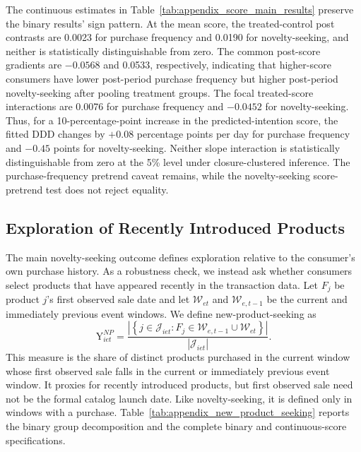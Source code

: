 \documentclass[11 pt]{article}
\begin{document}
The continuous estimates in Table~\ref{tab:appendix_score_main_results} preserve the binary results' sign pattern. At the mean score, the treated-control post contrasts are 0.0023 for purchase frequency and 0.0190 for novelty-seeking, and neither is statistically distinguishable from zero. The common post-score gradients are $-0.0568$ and 0.0533, respectively, indicating that higher-score consumers have lower post-period purchase frequency but higher post-period novelty-seeking after pooling treatment groups. The focal treated-score interactions are 0.0076 for purchase frequency and $-0.0452$ for novelty-seeking. Thus, for a 10-percentage-point increase in the predicted-intention score, the fitted DDD changes by $+0.08$ percentage points per day for purchase frequency and $-0.45$ points for novelty-seeking. Neither slope interaction is statistically distinguishable from zero at the 5\% level under closure-clustered inference. The purchase-frequency pretrend caveat remains, while the novelty-seeking score-pretrend test does not reject equality.

\subsection{Exploration of Recently Introduced Products}
\label{app:new_product_seeking}

The main novelty-seeking outcome defines exploration relative to the consumer's own purchase history. As a robustness check, we instead ask whether consumers select products that have appeared recently in the transaction data. Let $F_j$ be product $j$'s first observed sale date and let $\mathcal{W}_{et}$ and $\mathcal{W}_{e,t-1}$ be the current and immediately previous event windows. We define new-product-seeking as
\begin{equation}
	\text{Y}^{NP}_{iet}
	= \frac{\left|\left\{j\in\mathcal{J}_{iet}:F_j\in
	\mathcal{W}_{e,t-1}\cup\mathcal{W}_{et}\right\}\right|}
	{\left|\mathcal{J}_{iet}\right|}.
\end{equation}
This measure is the share of distinct products purchased in the current window whose first observed sale falls in the current or immediately previous event window. It proxies for recently introduced products, but first observed sale need not be the formal catalog launch date. Like novelty-seeking, it is defined only in windows with a purchase. Table~\ref{tab:appendix_new_product_seeking} reports the binary group decomposition and the complete binary and continuous-score specifications.
\end{document}
